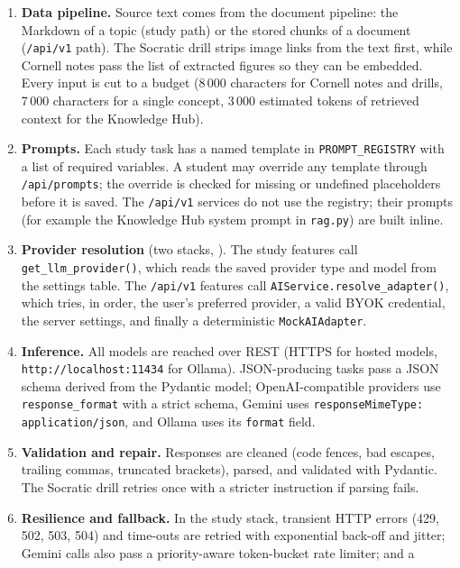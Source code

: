\begin{enumerate}[leftmargin=*]
  \item \textbf{Data pipeline.} Source text comes from the document pipeline: the
    Markdown of a topic (study path) or the stored chunks of a document (\texttt{/api/v1}
    path). The Socratic drill strips image links from the text first, while Cornell
    notes pass the list of extracted figures so they can be embedded. Every input is
    cut to a budget (8\,000 characters for Cornell notes and drills, 7\,000
    characters for a single concept, 3\,000 estimated tokens of retrieved context for the
    Knowledge Hub).
  \item \textbf{Prompts.} Each study task has a named template in
    \texttt{PROMPT\_REGISTRY} with a list of required variables. A student may override
    any template through \texttt{/api/prompts}; the override is checked for missing or
    undefined placeholders before it is saved. The \texttt{/api/v1} services do not use
    the registry; their prompts (for example the Knowledge Hub system prompt in
    \texttt{rag.py}) are built inline.
  \item \textbf{Provider resolution} (two stacks, ). The study features call
    \texttt{get\_llm\_provider()}, which reads the saved provider type and model from
    the settings table. The \texttt{/api/v1} features call
    \texttt{AIService.resolve\_adapter()}, which tries, in order, the user's preferred
    provider, a valid BYOK credential, the server settings, and finally a deterministic
    \texttt{MockAIAdapter}.
  \item \textbf{Inference.} All models are reached over REST (HTTPS for hosted models,
    \texttt{http://localhost:11434} for Ollama). JSON-producing tasks pass a JSON schema
    derived from the Pydantic model; OpenAI-compatible providers use
    \texttt{response\_format} with a strict schema, Gemini uses
    \texttt{responseMimeType: application/json}, and Ollama uses its \texttt{format}
    field.
  \item \textbf{Validation and repair.} Responses are cleaned (code fences, bad escapes,
    trailing commas, truncated brackets), parsed, and validated with Pydantic. The
    Socratic drill retries once with a stricter instruction if parsing fails.
  \item \textbf{Resilience and fallback.} In the study stack, transient HTTP errors
    (429, 502, 503, 504) and time-outs are retried with exponential back-off and jitter;
    Gemini calls also pass a priority-aware token-bucket rate limiter; and a

\end{enumerate}
